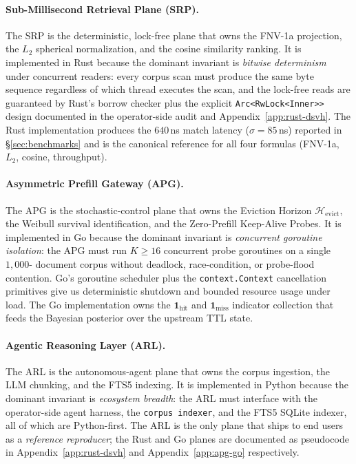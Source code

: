 \paragraph{Sub-Millisecond Retrieval Plane (SRP).}
The SRP is the deterministic, lock-free plane that owns the FNV-1a
projection, the $L_2$ spherical normalization, and the cosine
similarity ranking. It is implemented in Rust because the dominant
invariant is \emph{bitwise determinism} under concurrent readers: every
corpus scan must produce the same byte sequence regardless of which
thread executes the scan, and the lock-free reads are guaranteed by
Rust's borrow checker plus the explicit \texttt{Arc<RwLock<Inner>>}
design documented in the operator-side audit and Appendix~\ref{app:rust-dsvh}. The Rust
implementation produces the $640$\,ns match latency ($\sigma = 85$\,ns)
reported in \S\ref{sec:benchmarks} and is the canonical reference for
all four formulas (FNV-1a, $L_2$, cosine, throughput).

\paragraph{Asymmetric Prefill Gateway (APG).}
The APG is the stochastic-control plane that owns the Eviction Horizon
$\mathcal{H}_{\text{evict}}$, the Weibull survival identification, and
the Zero-Prefill Keep-Alive Probes. It is implemented in Go because the
dominant invariant is \emph{concurrent goroutine isolation}: the APG
must run $K \ge 16$ concurrent probe goroutines on a single $1{,}000$-
document corpus without deadlock, race-condition, or probe-flood
contention. Go's goroutine scheduler plus the \texttt{context.Context}
cancellation primitives give us deterministic shutdown and bounded
resource usage under load. The Go implementation owns the
$\mathbf{1}_{\text{hit}}$ and $\mathbf{1}_{\text{miss}}$ indicator
collection that feeds the Bayesian posterior over the upstream TTL
state.

\paragraph{Agentic Reasoning Layer (ARL).}
The ARL is the autonomous-agent plane that owns the corpus ingestion,
the LLM chunking, and the FTS5 indexing. It is implemented in Python
because the dominant invariant is \emph{ecosystem breadth}: the ARL
must interface with the operator-side agent harness, the
\texttt{corpus indexer}, and the FTS5 SQLite
indexer, all of which are Python-first. The ARL is the only plane that
ships to end users as a \emph{reference reproducer}; the Rust and Go
planes are documented as pseudocode in Appendix~\ref{app:rust-dsvh} and
Appendix~\ref{app:apg-go} respectively.


